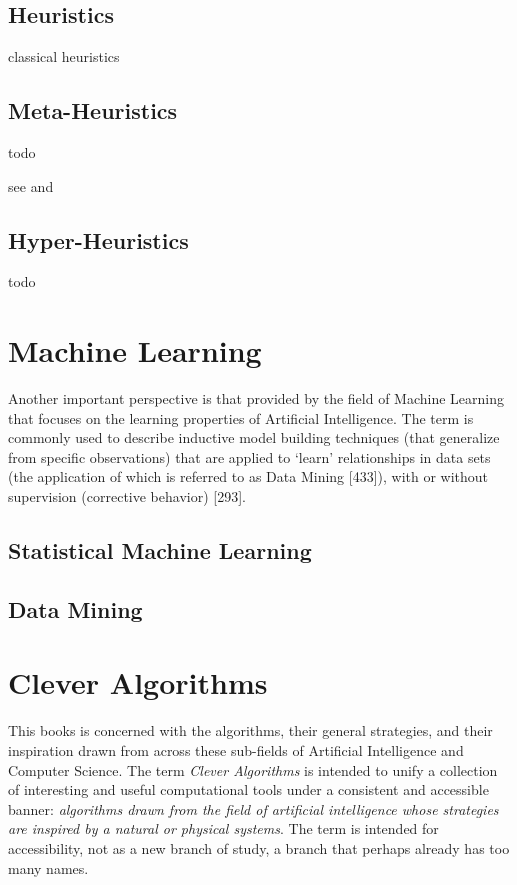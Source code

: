 \documentclass[a4paper, 11pt]{article}
\begin{document}
\subsection{Heuristics}
classical heuristics

\subsection{Meta-Heuristics}
todo

see \cite{Glover2003} and \cite{Talbi2009}

\subsection{Hyper-Heuristics}
todo

% 
% 
\section{Machine Learning}
\label{sec:machine_learning}
Another important perspective is that provided by the field of Machine Learning that focuses on the learning properties of Artificial Intelligence. The term is commonly used to describe inductive model building techniques (that generalize from specific observations) that are applied to ‘learn’ relationships in data sets (the application of which is referred to as Data Mining [433]), with or without supervision (corrective behavior) [293].

\subsection{Statistical Machine Learning}

\subsection{Data Mining}

% 
% 
\section{Clever Algorithms}
\label{sec:clever_algorithms}
This books is concerned with the algorithms, their general strategies, and their inspiration drawn from across these sub-fields of Artificial Intelligence and Computer Science. The term \emph{Clever Algorithms} is intended to unify a collection of interesting and useful computational tools under a consistent and accessible banner: \emph{algorithms drawn from the field of artificial intelligence whose strategies are inspired by a natural or physical systems}. The term is intended for accessibility, not as a new branch of study, a branch that perhaps already has too many names.
\end{document}
